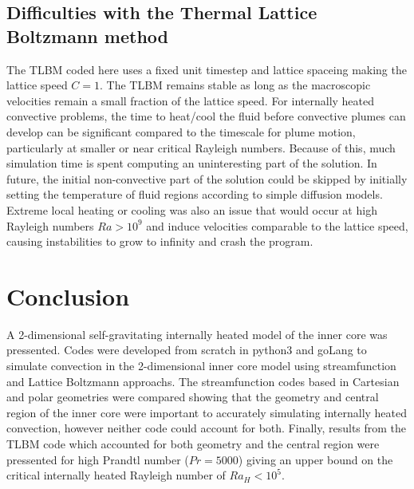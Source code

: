 \documentclass{article}
\begin{document}
\subsection*{Difficulties with the Thermal Lattice Boltzmann method}
The TLBM coded here uses a fixed unit timestep and lattice spaceing making the lattice speed $C=1$. The TLBM remains stable as long as the macroscopic velocities remain a small fraction of the lattice speed. For internally heated convective problems, the time to heat/cool the fluid before convective plumes can develop can be significant compared to the timescale for plume motion, particularly at smaller or near critical Rayleigh numbers. Because of this, much simulation time is spent computing an uninteresting part of the solution. In future, the initial non-convective part of the solution could be skipped by initially setting the temperature of fluid regions according to simple diffusion models.
\newline
\noindent Extreme local heating or cooling was also an issue that would occur at high Rayleigh numbers $Ra>10^9$ and induce velocities comparable to the lattice speed, causing instabilities to grow to infinity and crash the program.
\newline



\section*{Conclusion}
A 2-dimensional self-gravitating internally heated model of the inner core was pressented. Codes were developed from scratch in python3 and goLang to simulate convection in the 2-dimensional inner core model using streamfunction and Lattice Boltzmann approachs. The streamfunction codes based in Cartesian and polar geometries were compared showing that the geometry and central region of the inner core were important to accurately simulating internally heated convection, however neither code could account for both. Finally, results from the TLBM code which accounted for both geometry and the central region were pressented for high Prandtl number ($Pr=5000$) giving an upper bound on the critical internally heated Rayleigh number of $Ra_H < 10^5$. 





\end{document}
